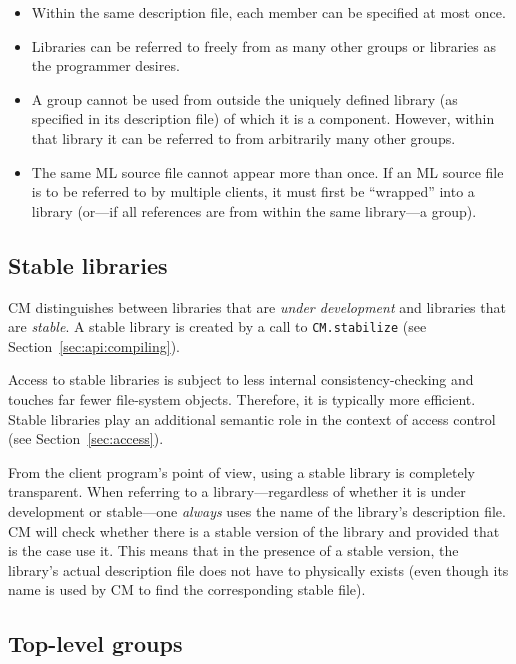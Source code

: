 \documentclass[titlepage,letterpaper]{article}
\begin{document}
\begin{itemize}
\item Within the same description file, each member can be specified
at most once.
\item Libraries can be referred to freely from as many other groups or
libraries as the programmer desires.
\item A group cannot be used from outside the uniquely defined library
(as specified in its description file) of which it is a component.
However, within that library it can be referred to from arbitrarily
many other groups.
\item The same ML source file cannot appear more than once.  If an ML
source file is to be referred to by multiple clients, it must first be
``wrapped'' into a library (or---if all references are from within the
same library---a group).
\end{itemize}

\subsection{Stable libraries}
\label{sec:stable}

CM distinguishes between libraries that are {\em under development}
and libraries that are {\em stable}.  A stable library is created by a
call to {\tt CM.stabilize} (see Section~\ref{sec:api:compiling}).

Access to stable libraries is subject to less internal
consistency-checking and touches far fewer file-system
objects. Therefore, it is typically more efficient.  Stable libraries
play an additional semantic role in the context of access control (see
Section~\ref{sec:access}).

From the client program's point of view, using a stable library is
completely transparent.  When referring to a library---regardless of
whether it is under development or stable---one {\em always} uses the
name of the library's description file.  CM will check whether there
is a stable version of the library and provided that is the case use
it.  This means that in the presence of a stable version, the
library's actual description file does not have to physically exists
(even though its name is used by CM to find the corresponding stable
file).

\subsection{Top-level groups}
\end{document}
